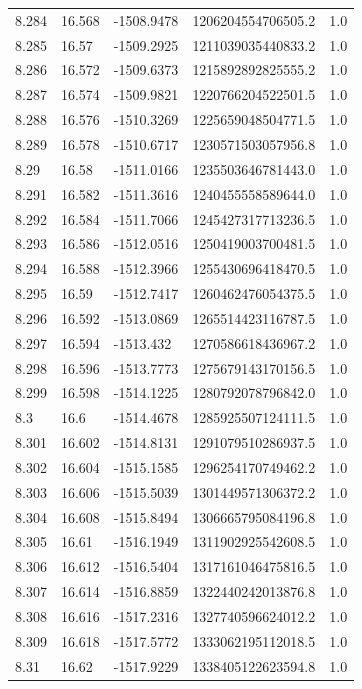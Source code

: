 \begin{tabular}{lllll}
8.284 & 16.568 & -1508.9478 & 1206204554706505.2 & 1.0 \\
8.285 & 16.57 & -1509.2925 & 1211039035440833.2 & 1.0 \\
8.286 & 16.572 & -1509.6373 & 1215892892825555.2 & 1.0 \\
8.287 & 16.574 & -1509.9821 & 1220766204522501.5 & 1.0 \\
8.288 & 16.576 & -1510.3269 & 1225659048504771.5 & 1.0 \\
8.289 & 16.578 & -1510.6717 & 1230571503057956.8 & 1.0 \\
8.29 & 16.58 & -1511.0166 & 1235503646781443.0 & 1.0 \\
8.291 & 16.582 & -1511.3616 & 1240455558589644.0 & 1.0 \\
8.292 & 16.584 & -1511.7066 & 1245427317713236.5 & 1.0 \\
8.293 & 16.586 & -1512.0516 & 1250419003700481.5 & 1.0 \\
8.294 & 16.588 & -1512.3966 & 1255430696418470.5 & 1.0 \\
8.295 & 16.59 & -1512.7417 & 1260462476054375.5 & 1.0 \\
8.296 & 16.592 & -1513.0869 & 1265514423116787.5 & 1.0 \\
8.297 & 16.594 & -1513.432 & 1270586618436967.2 & 1.0 \\
8.298 & 16.596 & -1513.7773 & 1275679143170156.5 & 1.0 \\
8.299 & 16.598 & -1514.1225 & 1280792078796842.0 & 1.0 \\
8.3 & 16.6 & -1514.4678 & 1285925507124111.5 & 1.0 \\
8.301 & 16.602 & -1514.8131 & 1291079510286937.5 & 1.0 \\
8.302 & 16.604 & -1515.1585 & 1296254170749462.2 & 1.0 \\
8.303 & 16.606 & -1515.5039 & 1301449571306372.2 & 1.0 \\
8.304 & 16.608 & -1515.8494 & 1306665795084196.8 & 1.0 \\
8.305 & 16.61 & -1516.1949 & 1311902925542608.5 & 1.0 \\
8.306 & 16.612 & -1516.5404 & 1317161046475816.5 & 1.0 \\
8.307 & 16.614 & -1516.8859 & 1322440242013876.8 & 1.0 \\
8.308 & 16.616 & -1517.2316 & 1327740596624012.2 & 1.0 \\
8.309 & 16.618 & -1517.5772 & 1333062195112018.5 & 1.0 \\
8.31 & 16.62 & -1517.9229 & 1338405122623594.8 & 1.0 \\

\end{tabular}

